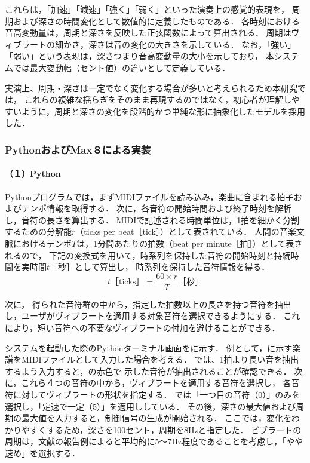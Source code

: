 これらは，「加速」「減速」「強く」「弱く」といった演奏上の感覚的表現を，
周期および深さの時間変化として数値的に定義したものである．
各時刻における音高変動量は，周期と深さを反映した正弦関数によって算出される．
周期はヴィブラートの細かさ，深さは音の変化の大きさを示している．
なお，「強い」「弱い」という表現は，深さつまり音高変動量の大小を示しており，
本システムでは最大変動幅（セント値）の違いとして定義している．

実演上、周期・深さは一定でなく変化する場合が多いと考えられるため本研究では，
これらの複雑な揺らぎをそのまま再現するのではなく，初心者が理解しやすいように，周期と深さの変化を段階的かつ単純な形に抽象化したモデルを採用した．



\subsubsection{PythonおよびMax８による実装}

\paragraph*{（１）Python}

Pythonプログラムでは，まずMIDIファイルを読み込み，楽曲に含まれる拍子およびテンポ情報を取得する．
次に，各音符の開始時間および終了時刻を解析し，音符の長さを算出する．
MIDIで記述される時間単位は，1拍を細かく分割するための分解能$r$（ticks per beat［tick］）として表されている．
人間の音楽文脈におけるテンポ$T$は，1分間あたりの拍数（beat per minute［拍］）として表されるので，
下記の変換式を用いて，時系列を保持した音符の開始時刻と持続時間を実時間$t$［秒］として算出し，
時系列を保持した音符情報を得る．
\begin{displaymath}
	t\text{［ticks］} = \frac{60\times r}{T}    \text{［秒］}
\end{displaymath}

次に，
得られた音符群の中から，指定した拍数以上の長さを持つ音符を抽出し，ユーザがヴィブラートを適用する対象音符を選択できるようにする．
これにより，短い音符への不要なヴィブラートの付加を避けることができる．

システムを起動した際のPythonターミナル画面をに示す．
例として，に示す楽譜をMIDIファイルとして入力した場合を考える．
では、1拍より長い音を抽出するよう入力すると，の赤色で
示した音符が抽出されることが確認できる．
次に，これら４つの音符の中から，ヴィブラートを適用する音符を選択し，
各音符に対してヴィブラートの形状を指定する．
では「一つ目の音符（0）」のみを選択し，「定速で一定（5）」を適用ししている．
その後，深さの最大値および周期の最大値を入力すると，制御信号の生成が開始される．
ここでは，変化をわかりやすくするため，深さを100セント，周期を8Hzと指定した．
ビブラートの周期は，文献\cite{Seashore38,Sundberg87}の報告例によると平均的に5～7Hz程度であることを考慮し，「やや速め」を選択する．

